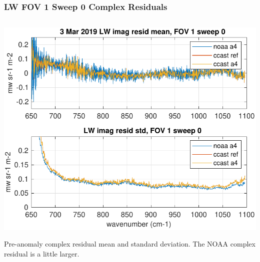 \documentclass[10pt]{beamer}
\begin{document}
\begin{frame}
\begin{columns}[t]
\begin{column}{0.5\textwidth}
\end{column}
\end{columns}
\end{frame}
\begin{frame}
\frametitle{LW FOV 1 Sweep 0 Complex Residuals}
\begin{columns}[t]
\begin{column}{0.5\textwidth}
  \begin{centering}
  \includegraphics[width=\textwidth]{figures/LW_MW_good_imag_fov1_sd0.pdf}
  \end{centering}\vspace{3mm}
  Pre-anomaly complex residual mean and standard deviation.  The
  NOAA complex residual is a little larger.


\end{column}
\end{columns}
\end{frame}
\end{document}
